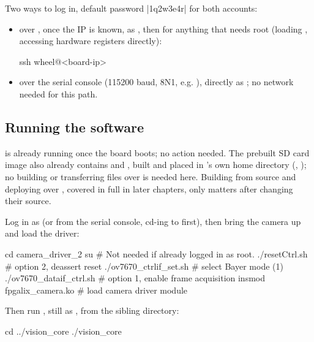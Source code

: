 Two ways to log in, default password |1q2w3e4r| for both accounts:

\begin{itemize}
    \item over , once the IP is known, as , then  for anything that needs root (loading , accessing hardware registers directly):

\begin{shellcodehost}
ssh wheel@<board-ip>
\end{shellcodehost}

    \item over the serial console (115200 baud, 8N1, e.g. ), directly as ; no network needed for this path.
\end{itemize}

\subsection{Running the software}

 is already running once the board boots; no action needed. The prebuilt SD card image also already contains  and , built and placed in 's own home directory (, ); no building or transferring files over  is needed here. Building from source and deploying over , covered in full in later chapters, only matters after changing their source.

Log in as  (or  from the serial console, cd-ing to  first), then bring the camera up and load the driver:

\begin{shellcodeboard}
cd camera_driver_2
su                              # Not needed if already logged in as root.
./resetCtrl.sh                  # option 2, deassert reset
./ov7670_ctrlif_set.sh          # select Bayer mode (1)
./ov7670_dataif_ctrl.sh         # option 1, enable frame acquisition
insmod fpgalix_camera.ko        # load camera driver module
\end{shellcodeboard}

Then run , still as , from the sibling directory:

\begin{shellcodeboard}
cd ../vision_core
./vision_core
\end{shellcodeboard}

